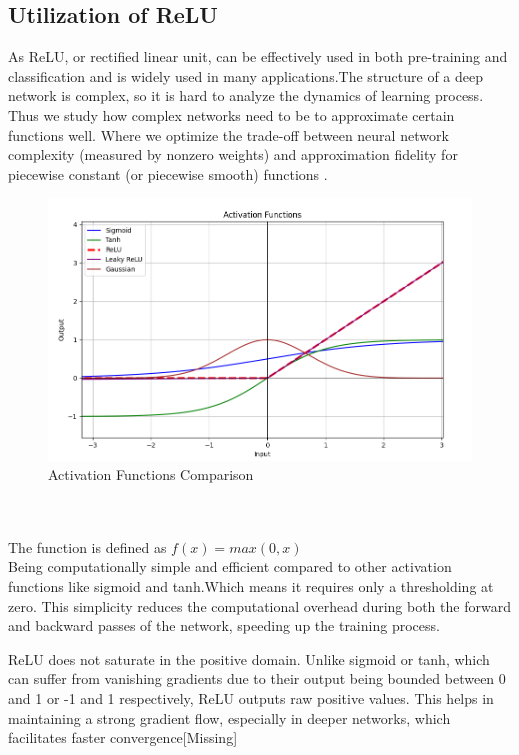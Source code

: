 \documentclass[conference]{IEEEtran}
\begin{document}
\subsection{Utilization of ReLU}
As ReLU, or rectified linear unit, can be effectively used in both pre-training and classification and is widely used in many applications.The structure of a deep network is complex, so it is hard to analyze the dynamics of learning process. Thus we study how complex networks need to be to approximate certain functions well. Where we optimize the trade-off between neural network complexity (measured by nonzero weights) and approximation fidelity for piecewise constant (or piecewise smooth) functions \cite{b1}.
\begin{figure}[h]
    \centering
    \includegraphics[width=\linewidth]{Activation Functions Compare.PNG}
    \caption{Activation Functions Comparison}
    \label{fig}
\end{figure}
\\
\\
The function is defined as
\textbf{\(f(x) = max(0,x)\)}
\\

Being computationally simple and efficient compared to other activation functions like sigmoid and tanh.Which means it requires only a thresholding at zero. This simplicity reduces the computational overhead during both the forward and backward passes of the network, speeding up the training process.

ReLU does not saturate in the positive domain. Unlike sigmoid or tanh, which can suffer from vanishing gradients due to their output being bounded between 0 and 1 or -1 and 1 respectively, ReLU outputs raw positive values. This helps in maintaining a strong gradient flow, especially in deeper networks, which facilitates faster convergence[Missing]
\end{document}
